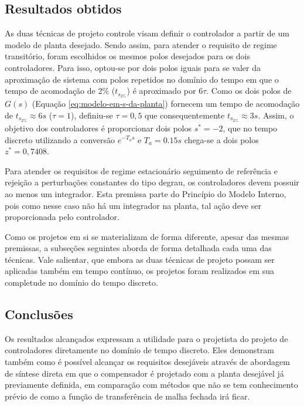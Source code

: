 \subsection{Resultados obtidos}
As duas técnicas de projeto controle visam definir o controlador a partir de um
modelo de planta desejado. Sendo assim, para atender o requisito de regime
transitório, foram escolhidos os mesmos polos desejados para os dois
controladores. Para isso, optou-se por dois polos iguais para se valer da
aproximação de sistema com polos repetidos no domínio do tempo em que o tempo de
acomodação de 2\% ($t_{s_{2\%}}$) é aproximado por $6\tau$. Como os dois polos
de $G(s)$ (Equação \ref{eq:modelo-em-s-da-planta}) fornecem um tempo de
acomodação de $t_{s_{2\%}}\approx 6s$ ($\tau = 1$), definiu-se $\tau = 0,5$ que
consequentemente $t_{s_{2\%}}\approx 3s$. Assim, o objetivo dos
controladores é proporcionar dois polos $s^*=-2$, que no tempo discreto
utilizando a conversão $e^{-T_{a}s}$ e $T_{a} = 0.15s$ chega-se a dois polos
$z^*=0,7408$.

Para atender os requisitos de regime estacionário seguimento de referência e
rejeição a perturbações constantes do tipo degrau, os controladores devem
possuir ao menos um integrador. Esta premissa parte do Princípio do Modelo
Interno, pois como nesse caso não há um integrador na planta, tal ação deve ser
proporcionada pelo controlador.

Como os projetos em si se materializam de forma diferente, apesar das mesmas
premissas, a subseções seguintes aborda de forma detalhada cada uma das
técnicas. Vale salientar, que embora as duas técnicas de projeto possam ser
aplicadas também em tempo contínuo, os projetos foram realizados em sua
completude no domínio do tempo discreto.





\subsection{Conclusões}
Os resultados alcançados expressam a utilidade para o projetista do projeto de
controladores diretamente no domínio de tempo discreto. Eles demonstram também
como é possível alcançar os requisitos desejáveis através de abordagem de
síntese direta em que o compensador é projetado com a planta desejável já
previamente definida, em comparação com métodos que não se tem conhecimento
prévio de como a função de transferência de malha fechada irá ficar.
